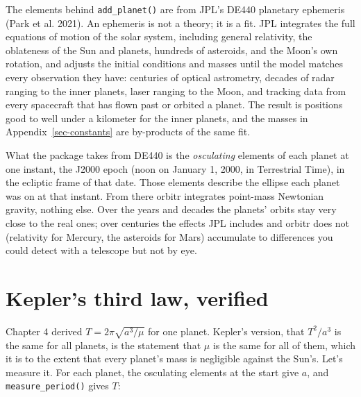 \documentclass[
  10.5pt,
  letterpaper,
]{scrbook}
\theoremstyle{plain}
\theoremstyle{remark}
\begin{document}
The elements behind \texttt{add\_planet()} are from JPL's DE440
planetary ephemeris (Park et al. 2021). An ephemeris is not a theory; it
is a fit. JPL integrates the full equations of motion of the solar
system, including general relativity, the oblateness of the Sun and
planets, hundreds of asteroids, and the Moon's own rotation, and adjusts
the initial conditions and masses until the model matches every
observation they have: centuries of optical astrometry, decades of radar
ranging to the inner planets, laser ranging to the Moon, and tracking
data from every spacecraft that has flown past or orbited a planet. The
result is positions good to well under a kilometer for the inner
planets, and the masses in Appendix~\ref{sec-constants} are by-products
of the same fit.

What the package takes from DE440 is the \emph{osculating} elements of
each planet at one instant, the J2000 epoch (noon on January 1, 2000, in
Terrestrial Time), in the ecliptic frame of that date. Those elements
describe the ellipse each planet was on at that instant. From there
orbitr integrates point-mass Newtonian gravity, nothing else. Over the
years and decades the planets' orbits stay very close to the real ones;
over centuries the effects JPL includes and orbitr does not (relativity
for Mercury, the asteroids for Mars) accumulate to differences you could
detect with a telescope but not by eye.

\section{Kepler's third law, verified}\label{keplers-third-law-verified}

Chapter 4 derived \(T = 2\pi\sqrt{a^3/\mu}\) for one planet. Kepler's
version, that \(T^2/a^3\) is the same for all planets, is the statement
that \(\mu\) is the same for all of them, which it is to the extent that
every planet's mass is negligible against the Sun's. Let's measure it.
For each planet, the osculating elements at the start give \(a\), and
\texttt{measure\_period()} gives \(T\):
\end{document}
